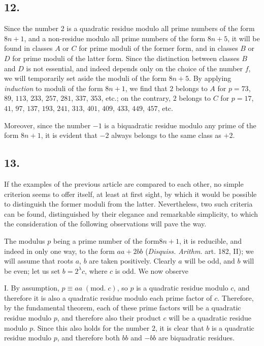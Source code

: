 \documentclass[twoside,12pt]{memoir}
\renewcommand{\pmod}[1]{\;(\textrm{mod.}\;#1)}
\begin{document}
\subsection*{12.}
 
Since the number 2 is a quadratic residue modulo all prime numbers of the form \(8n+1\), and a non-residue modulo all prime numbers of the form \(8n+5\), it will be found in classes \(A\) or \(C\) for prime moduli of the former form, and in classes \(B\) or \(D\) for prime moduli of the latter form. Since the distinction between classes \(B\) and \(D\) is not essential, and indeed depends only on the choice of the number \(f\), we will temporarily set aside the moduli of the form \(8n+5\). By applying \textit{induction} to moduli of the form \(8n+1\), we find that \(2\) belongs to \(A\) for \(p=73\), \(89\), \(113\), \(233\), \(257\), \(281\), \(337\), \(353\), etc{.}; on the contrary, \(2\) belongs to \(C\) for \(p=17\), \(41\), \(97\), \(137\), \(193\), \(241\), \(313\), \(401\), \(409\), \(433\), \(449\), \(457\), etc{.}
 
Moreover, since the number \(-1\) is a biquadratic residue modulo any prime of the form \(8n+1\), it is evident that \(-2\) always belongs to the same class as \(+2\).\pagebreak%

\subsection*{13.}

If the examples of the previous article are compared to each other, no simple criterion seems to offer itself, at least at first sight, by which it would be possible to distinguish the former moduli from the latter.  Nevertheless, two such criteria can be found, distinguished by their elegance and remarkable simplicity, to which the consideration of the following observations will pave the way.

The modulus \(p\) being a prime number of the form\(8 n+1\), it is reducible, and indeed in only one way, to the form \(a a+2 b b\) (\textit{Disquiss. Arithm.} art. 182, II); we will assume that roots \(a\), \(b\) are taken positively. Clearly \(a\) will be odd, and \(b\) will be even; let us set \(b=2^{\lambda} c\), where \(c\) is odd.  We now observe

I. By assumption, \(p \equiv a a \pmod{{c}}\), so \(p\) is a quadratic residue modulo \(c\), and therefore it is also a quadratic residue modulo each prime factor of \(c\).  Therefore, by the fundamental theorem, each of these prime factors will be a quadratic residue modulo \(p\), and therefore also their product \(c\) will be a quadratic residue modulo \(p\). Since this also holds for the number \(2\), it is clear that \(b\) is a quadratic residue modulo \(p\), and therefore both \(b b\) and \(-b b\) are biquadratic residues.
\end{document}
